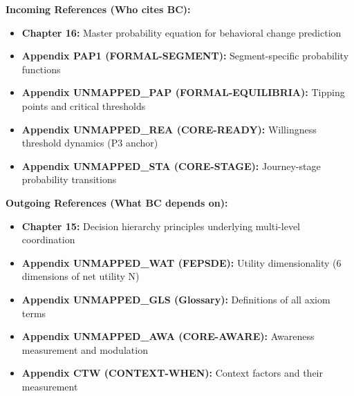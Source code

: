 \documentclass[11pt, a4paper]{article}
\begin{document}
\begin{tcolorbox}[colback=cyan!5!white, colframe=cyan!75!black, title=Cross-Reference Map]
\textbf{Incoming References (Who cites BC):}
\begin{itemize}[nosep]
    \item \textbf{Chapter 16:} Master probability equation for behavioral change prediction
    \item \textbf{Appendix PAP1 (FORMAL-SEGMENT):} Segment-specific probability functions
    \item \textbf{Appendix UNMAPPED_PAP (FORMAL-EQUILIBRIA):} Tipping points and critical thresholds
    \item \textbf{Appendix UNMAPPED_REA (CORE-READY):} Willingness threshold dynamics (P3 anchor)
    \item \textbf{Appendix UNMAPPED_STA (CORE-STAGE):} Journey-stage probability transitions
\end{itemize}

\textbf{Outgoing References (What BC depends on):}
\begin{itemize}[nosep]
    \item \textbf{Chapter 15:} Decision hierarchy principles underlying multi-level coordination
    \item \textbf{Appendix UNMAPPED_WAT (FEPSDE):} Utility dimensionality (6 dimensions of net utility N)
    \item \textbf{Appendix UNMAPPED_GLS (Glossary):} Definitions of all axiom terms
    \item \textbf{Appendix UNMAPPED_AWA (CORE-AWARE):} Awareness measurement and modulation
    \item \textbf{Appendix CTW (CONTEXT-WHEN):} Context factors and their measurement
\end{itemize}
\end{tcolorbox}

\end{document}
